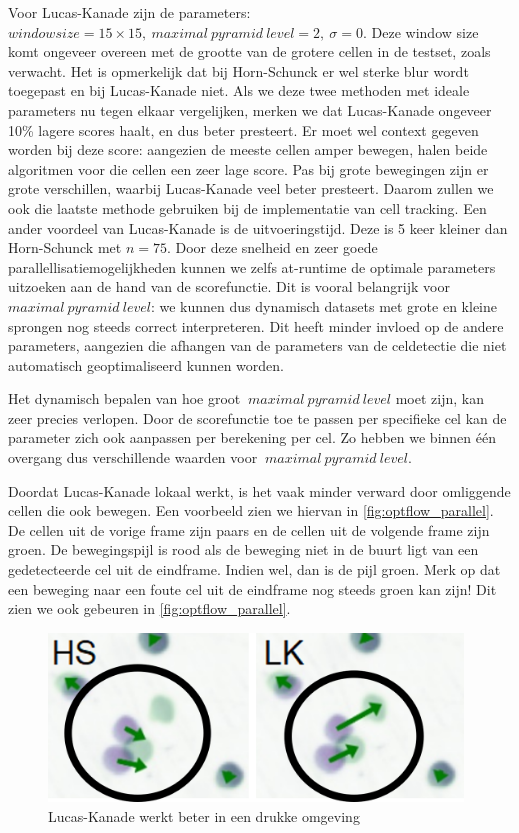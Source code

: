 \documentclass{article}
\begin{document}
\begin{multicols}{2}
Voor Lucas-Kanade zijn de parameters: $window size = 15\times15,\ maximal\ pyramid\ level = 2,\ \sigma = 0$. Deze window size komt ongeveer overeen met de grootte van de grotere cellen in de testset, zoals verwacht.
Het is opmerkelijk dat bij Horn-Schunck er wel sterke blur wordt toegepast en bij Lucas-Kanade niet. Als we deze twee methoden met ideale parameters nu tegen elkaar vergelijken, merken we dat Lucas-Kanade ongeveer 10\% lagere scores haalt, en dus beter presteert. Er moet wel context gegeven worden bij deze score: aangezien de meeste cellen amper bewegen, halen beide algoritmen voor die cellen een zeer lage score. Pas bij grote bewegingen zijn er grote verschillen, waarbij Lucas-Kanade veel beter presteert. Daarom zullen we ook die laatste methode gebruiken bij de implementatie van cell tracking. Een ander voordeel van Lucas-Kanade is de uitvoeringstijd. Deze is 5 keer kleiner dan Horn-Schunck met $n = 75$. Door deze snelheid en zeer goede parallellisatiemogelijkheden kunnen we zelfs at-runtime de optimale parameters uitzoeken aan de hand van de scorefunctie. Dit is vooral belangrijk voor $maximal\ pyramid\ level$: we kunnen dus dynamisch datasets met grote en kleine sprongen nog steeds correct interpreteren. Dit heeft minder invloed op de andere parameters, aangezien die afhangen van de parameters van de celdetectie die niet automatisch geoptimaliseerd kunnen worden.

Het dynamisch bepalen van hoe groot $\ maximal\ pyramid\ level$ moet zijn, kan zeer precies verlopen. Door de scorefunctie toe te passen per specifieke cel kan de parameter zich ook aanpassen per berekening per cel. Zo hebben we binnen één overgang dus verschillende waarden voor $\ maximal\ pyramid\ level$.

Doordat Lucas-Kanade lokaal werkt, is het vaak minder verward door omliggende cellen die ook bewegen. Een voorbeeld zien we hiervan in \autoref{fig:optflow_parallel}. De cellen uit de vorige frame zijn paars en de cellen uit de volgende frame zijn groen. De bewegingspijl is rood als de beweging niet in de buurt ligt van een gedetecteerde cel uit de eindframe. Indien wel, dan is de pijl groen. Merk op dat een beweging naar een foute cel uit de eindframe nog steeds groen kan zijn! Dit zien we ook gebeuren in \autoref{fig:optflow_parallel}.
\begin{figure}[H]
\centering
\includegraphics[width=0.98\textwidth]{images/optflow_parallel.png}
\caption{\label{fig:optflow_parallel}Lucas-Kanade werkt beter in een drukke omgeving}
\end{figure}


\end{multicols}
\end{document}
